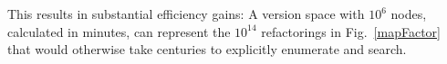 \documentclass[12pt]{article}
\begin{document}
This results in substantial efficiency gains: A version space with $10^6$ nodes, calculated in minutes, can represent the $10^{14}$ refactorings in Fig.~\ref{mapFactor} that would otherwise take centuries to explicitly enumerate and search. 
\end{document}

